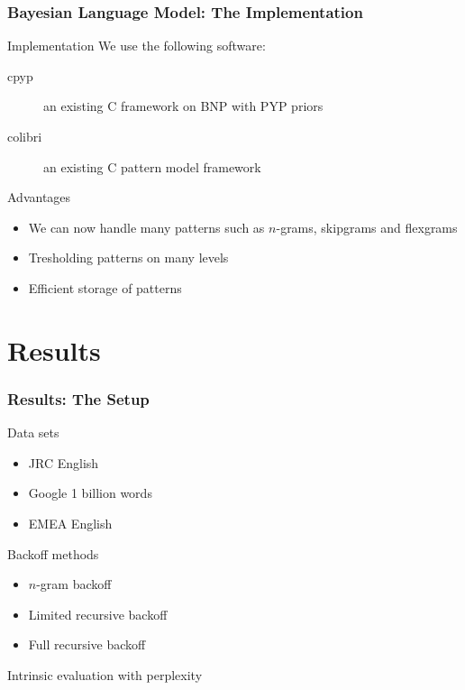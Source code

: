 \documentclass[11pt,t]{beamer}
\def\CC{{C\nolinebreak[4]\hspace{-.05em}\raisebox{.4ex}{\tiny\bf ++}}}
\begin{document}
\begin{frame}
    \frametitle{Bayesian Language Model: The Implementation}

    \begin{block}{Implementation}
        We use the following software:
        \begin{description}
            \item[cpyp] an existing \CC{} framework on BNP with PYP priors
            \item[colibri] an existing \CC{} pattern model framework 
        \end{description}
    \end{block}

    \begin{block}{Advantages}
        \begin{itemize}
            \item We can now handle many patterns such as $n$-grams, skipgrams and flexgrams
            \item Tresholding patterns on many levels
            \item Efficient storage of patterns
        \end{itemize}
    \end{block}
\end{frame}

\section{Results}
\begin{frame}
    \frametitle{Results: The Setup}

            \begin{block}{Data sets}
                \begin{itemize}
                    \item JRC English
                    \item Google 1 billion words
                    \item EMEA English
                \end{itemize}
            \end{block}
            \begin{block}{Backoff methods}
                \begin{itemize}
                    \item $n$-gram backoff
                    \item Limited recursive backoff
                    \item Full recursive backoff
                \end{itemize}
            \end{block}

             Intrinsic evaluation with perplexity
\end{frame}
\end{document}
